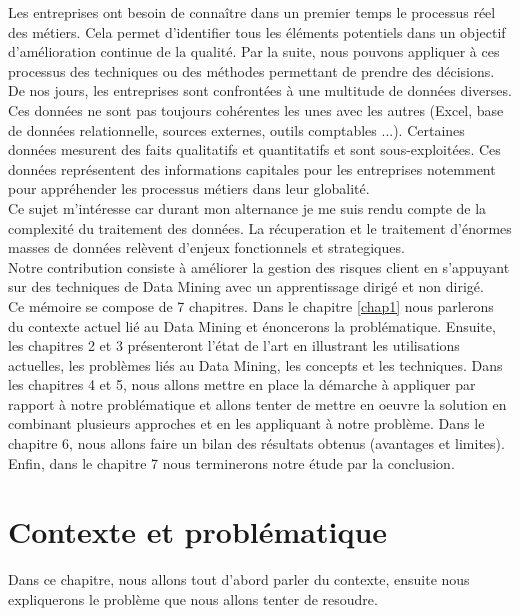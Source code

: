 \documentclass[11pt,a4paper]{report}
\begin{document}
Les entreprises ont besoin de connaître dans un premier temps le processus réel des métiers. Cela permet d'identifier tous les éléments potentiels dans un objectif d'amélioration continue de la qualité. Par la suite, nous pouvons appliquer à ces processus des techniques ou des méthodes permettant de prendre des décisions.
De nos jours, les entreprises sont confrontées à une multitude de données diverses. Ces données ne sont pas toujours cohérentes les unes avec les autres (Excel, base de données relationnelle, sources externes, outils comptables ...). Certaines données mesurent des faits qualitatifs et quantitatifs et sont sous-exploitées. Ces données représentent des informations capitales pour les entreprises notemment pour appréhender les processus métiers dans leur globalité.\\
Ce sujet m'intéresse car durant mon alternance je me suis rendu compte de la complexité du traitement des données. La récuperation et le traitement d'énormes masses de données relèvent d'enjeux fonctionnels et strategiques. \\
Notre contribution consiste à améliorer la gestion des risques client en s'appuyant sur des techniques de Data Mining avec un apprentissage dirigé et non dirigé.\\ 

Ce mémoire se compose de 7 chapitres. Dans le chapitre \ref{chap1} nous parlerons du contexte actuel lié au Data Mining et énoncerons la problématique. Ensuite, les chapitres 2 et 3 présenteront l'état de l'art en illustrant les utilisations actuelles, les problèmes liés au Data Mining, les concepts et les techniques. Dans les chapitres 4 et 5, nous allons mettre en place la démarche à appliquer par rapport à notre problématique et allons tenter de mettre en oeuvre la solution en combinant plusieurs approches et en les appliquant à notre problème. Dans le chapitre 6, nous allons faire un bilan des résultats obtenus (avantages et limites). Enfin, dans le chapitre 7 nous terminerons notre étude par la conclusion. 

\newpage

\tableofcontents
\thispagestyle{empty}
\newpage
\listoffigures

\newpage

\section{Contexte et problématique \label{chap1}}
Dans ce chapitre, nous allons tout d'abord parler du contexte, ensuite nous expliquerons le problème que nous allons tenter de resoudre. 
\end{document}
